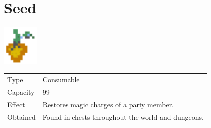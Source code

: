 \section{Seed}
\label{item:seed}

\includegraphics[height=2cm,keepaspectratio]{./resources/items/seed}

\begin{longtable}{ l p{9cm} }
	Type
	& Consumable
\\ %
	Capacity
	& 99
\\ %
	Effect
	& Restores magic charges of a party member.
\\ %
	Obtained
	& Found in chests throughout the world and dungeons.
\end{longtable}
